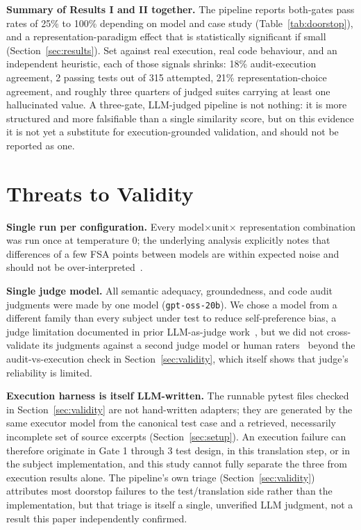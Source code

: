\documentclass[conference]{IEEEtran}
\begin{document}
\textbf{Summary of Results I and II together.} The pipeline reports
both-gates pass rates of 25\% to 100\% depending on model and case study
(Table~\ref{tab:doorstop}), and a representation-paradigm effect that is
statistically significant if small (Section~\ref{sec:results}). Set against real
execution, real code behaviour, and an independent heuristic, each of those
signals shrinks: 18\% audit-execution agreement, 2 passing tests out of
315 attempted, 21\% representation-choice agreement, and roughly three quarters of judged suites carrying at least one hallucinated value. A three-gate, LLM-judged pipeline is not nothing: it is more structured and more falsifiable than a single similarity score, but on this evidence it is not yet a substitute for execution-grounded validation, and should not be reported as one.

\section{Threats to Validity}
\label{sec:threats}

\textbf{Single run per configuration.} Every model$\times$unit$\times$
representation combination was run once at temperature 0; the underlying
analysis explicitly notes that differences of a few FSA points between models
are within expected noise and should not be over-interpreted~\cite{arcuri2014hitchhiker}.

\textbf{Single judge model.} All semantic adequacy, groundedness, and code
audit judgments were made by one model (\texttt{gpt-oss-20b}). We chose a
model from a different family than every subject under test to reduce
self-preference bias, a judge limitation documented in prior LLM-as-judge
work~\cite{zheng2023judging,panickssery2024selfpref}, but we did not cross-validate its judgments against a
second judge model or human raters~\cite{ahmed2025annotation} beyond the audit-vs-execution check in
Section~\ref{sec:validity}, which itself shows that judge's reliability is
limited.

\textbf{Execution harness is itself LLM-written.} The runnable pytest files
checked in Section~\ref{sec:validity} are not hand-written adapters; they are
generated by the same executor model from the canonical test case and a
retrieved, necessarily incomplete set of source excerpts (Section~\ref{sec:setup}).
An execution failure can therefore originate in Gate 1 through 3 test design,
in this translation step, or in the subject implementation, and this study
cannot fully separate the three from execution results alone. The pipeline's
own triage (Section~\ref{sec:validity}) attributes most doorstop failures to
the test/translation side rather than the implementation, but that triage is
itself a single, unverified LLM judgment, not a result this paper
independently confirmed.
\end{document}
